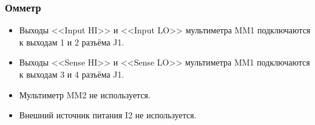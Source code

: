 \subsubsection{Омметр}

    \begin{itemize}
        \item Выходы <<Input HI>> и <<Input LO>> мультиметра MM1 подключаются к выходам 1 и 2 разъёма J1. 
        \item Выходы <<Sense HI>> и <<Sense LO>> мультиметра MM1 подключаются к выходам 3 и 4 разъёма J1. 
        \item Мультиметр MM2 не используется. 
        \item Внешний источник питания I2 не используется. 
    \end{itemize}
